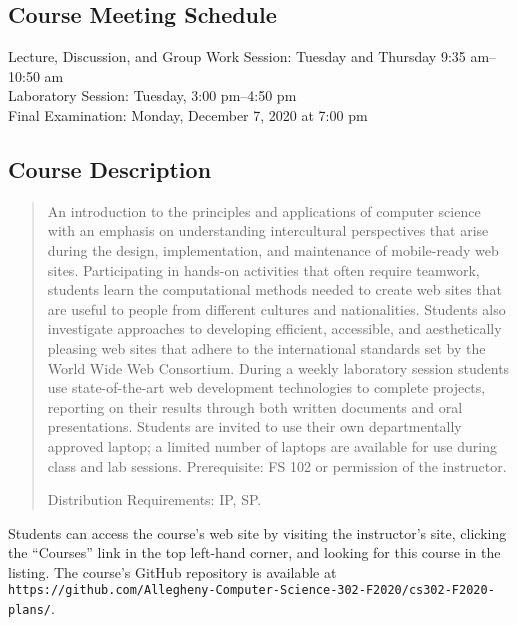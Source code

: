 \documentclass[11pt]{article}
\newcommand{\url}[1]{\lstinline{#1}}
\begin{document}
\vspace*{-.1in}

\subsection*{Course Meeting Schedule}

Lecture, Discussion, and Group Work Session: Tuesday and Thursday 9:35 am--10:50 am \\
Laboratory Session: Tuesday, 3:00 pm--4:50 pm \\
Final Examination: Monday, December 7, 2020 at 7:00 pm

\vspace*{-.1in}

\subsection*{Course Description}

\begin{quote}

An introduction to the principles and applications of computer science with an
emphasis on understanding intercultural perspectives that arise during the
design, implementation, and maintenance of mobile-ready web sites. Participating
in hands-on activities that often require teamwork, students learn the
computational methods needed to create web sites that are useful to people from
different cultures and nationalities. Students also investigate approaches to
developing efficient, accessible, and aesthetically pleasing web sites that
adhere to the international standards set by the World Wide Web Consortium.
During a weekly laboratory session students use state-of-the-art web development
technologies to complete projects, reporting on their results through both
written documents and oral presentations. Students are invited to use their own
departmentally approved laptop; a limited number of laptops are available for
use during class and lab sessions. Prerequisite: FS 102 or permission of the
instructor.

Distribution Requirements: IP, SP. \@ \\

\end{quote}

\noindent Students can access the course's web site by visiting the
instructor's site, clicking the ``Courses'' link in the top left-hand corner,
and looking for this course in the listing. The course's GitHub repository is
available at
\url{https://github.com/Allegheny-Computer-Science-302-F2020/cs302-F2020-plans/}.
\end{document}
